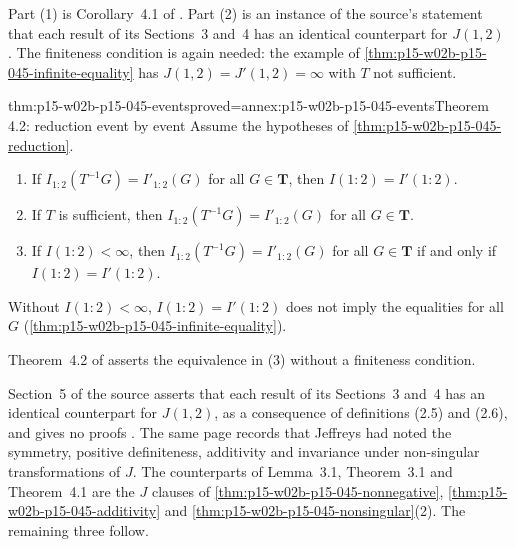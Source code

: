 Part (1) is Corollary~4.1 of \cite[p.~84]{KullbackLeibler1951Information}.
Part (2) is an instance of the source's statement that each result of
its Sections~3 and~4 has an identical counterpart for \(J(1,2)\)
\cite[p.~85]{KullbackLeibler1951Information}. The finiteness condition
is again needed: the example of
\cref{thm:p15-w02b-p15-045-infinite-equality} has
\(J(1,2)=J'(1,2)=\infty\) with \(T\) not sufficient.

\begin{hbtheorem}{thm:p15-w02b-p15-045-events}{proved=annex:p15-w02b-p15-045-events}{Theorem 4.2: reduction event by event}
Assume the hypotheses of \cref{thm:p15-w02b-p15-045-reduction}.
\begin{enumerate}
\item If \(I_{1:2}(T^{-1}G)=I'_{1:2}(G)\) for all \(G\in\mathbf T\),
then \(I(1:2)=I'(1:2)\).
\item If \(T\) is sufficient, then \(I_{1:2}(T^{-1}G)=I'_{1:2}(G)\)
for all \(G\in\mathbf T\).
\item If \(I(1:2)<\infty\), then \(I_{1:2}(T^{-1}G)=I'_{1:2}(G)\) for all
\(G\in\mathbf T\) if and only if \(I(1:2)=I'(1:2)\).
\end{enumerate}
Without \(I(1:2)<\infty\), \(I(1:2)=I'(1:2)\) does not imply the
equalities for all \(G\) (\cref{thm:p15-w02b-p15-045-infinite-equality}).
\end{hbtheorem}

Theorem~4.2 of \cite[p.~84]{KullbackLeibler1951Information} asserts
the equivalence in (3) without a finiteness condition.

Section~5 of the source asserts that each result of its Sections~3
and~4 has an identical counterpart for \(J(1,2)\), as a consequence of
definitions (2.5) and (2.6), and gives no proofs
\cite[p.~85]{KullbackLeibler1951Information}. The same page records that
Jeffreys had noted the symmetry, positive definiteness, additivity and
invariance under non-singular transformations of \(J\). The counterparts
of Lemma~3.1, Theorem~3.1 and Theorem~4.1 are the \(J\) clauses of
\cref{thm:p15-w02b-p15-045-nonnegative},
\cref{thm:p15-w02b-p15-045-additivity} and
\cref{thm:p15-w02b-p15-045-nonsingular}(2). The remaining three follow.

